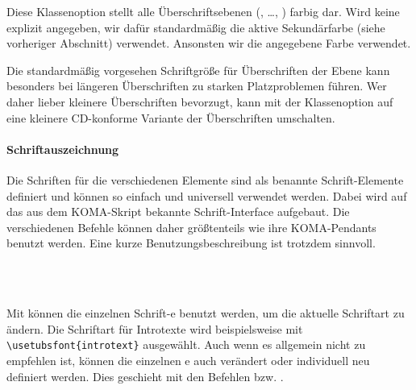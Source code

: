 \begin{Declaration}
\end{Declaration}

Diese Klassenoption stellt alle Überschriftsebenen
(, \ldots, ) farbig dar.
Wird keine  explizit angegeben, wir dafür standardmäßig die aktive
Sekundärfarbe (siehe vorheriger Abschnitt) verwendet.
Ansonsten wir die angegebene Farbe verwendet.

\begin{Declaration}
\end{Declaration}
Die standardmäßig vorgesehen Schriftgröße für Überschriften der Ebene 
kann besonders bei längeren Überschriften zu starken Platzproblemen führen.
Wer daher lieber kleinere Überschriften bevorzugt, kann mit der Klassenoption
 auf eine kleinere CD-konforme Variante der Überschriften
umschalten.

\paragraph{Schriftauszeichnung}\label{par:documents:schriftauszeichnung}

\begin{sloppypar}
Die Schriften für die verschiedenen Elemente sind als benannte Schrift-Elemente
definiert und können so einfach und universell verwendet werden.
Dabei wird auf das aus dem KOMA-Skript\cite{koma-skript} bekannte Schrift-Interface
aufgebaut. Die verschiedenen Befehle können daher größtenteils wie ihre KOMA-Pendants
benutzt werden. Eine kurze Benutzungsbeschreibung ist trotzdem sinnvoll.
\end{sloppypar}

\begin{Declaration}
  \\
  \\
\end{Declaration}

Mit  können die einzelnen Schrift-e benutzt
werden, um die aktuelle Schriftart zu ändern.
Die Schriftart für Introtexte wird beispielsweise mit\\
\lstinline!\usetubsfont{introtext}! ausgewählt.
Auch wenn es allgemein nicht zu empfehlen ist, können die einzelnen
e auch verändert oder individuell neu definiert werden.
Dies geschieht mit den Befehlen  bzw.
.


